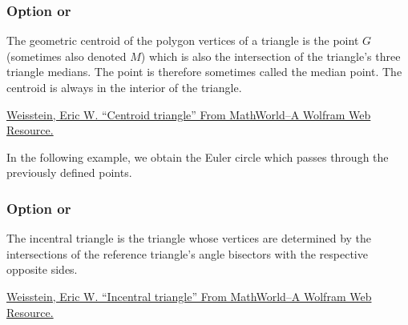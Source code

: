 \subsubsection{Option  or }

The geometric centroid  of the polygon vertices of a triangle is the point $G$
(sometimes also denoted $M$) which is also the intersection of the triangle's
three triangle medians. The point is therefore sometimes called the median
point. The centroid is always in the interior of the triangle.\par
\href{https://mathworld.wolfram.com/TriangleCentroid.html}{Weisstein, Eric W.
\enquote{Centroid triangle} From MathWorld--A Wolfram Web Resource.}

In the following example, we obtain the Euler circle which passes through the
previously defined points.

\begin{tkzexample}[latex=7cm,small]
\end{tkzexample}

\newpage

\subsubsection{Option  or }

The incentral triangle is the triangle whose vertices are determined by
the intersections of the reference triangle’s angle bisectors with the
respective opposite sides.\par
\href{https://mathworld.wolfram.com/ContactTriangle.html}{Weisstein, Eric W.
\enquote{Incentral triangle} From MathWorld--A Wolfram Web Resource.}

\begin{tkzexample}[latex=7cm,small]
\end{tkzexample}

